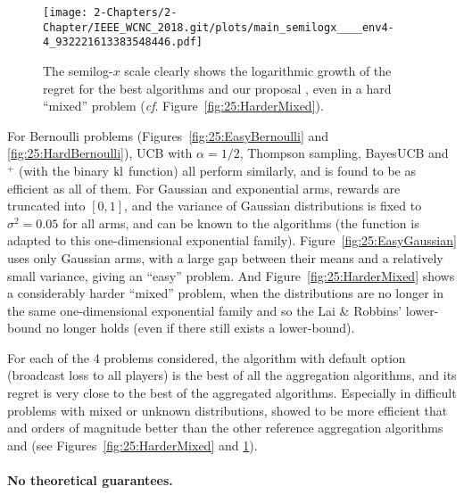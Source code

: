 \begin{figure}[b!]  %
	\centering
	\texttt{[image: 2-Chapters/2-Chapter/IEEE\_WCNC\_2018.git/plots/main\_semilogx\_\_\_\_env4-4\_932221613383548446.pdf]}
	\caption{The semilog-$x$ scale clearly shows the logarithmic growth of the regret for the best algorithms and our proposal \Aggr, even in a hard ``mixed'' problem (\emph{cf}. Figure~\ref{fig:25:HarderMixed}).}
	\label{fig:25:HarderMixed_semilogx}
\end{figure}

For Bernoulli problems (Figures~\ref{fig:25:EasyBernoulli} and \ref{fig:25:HardBernoulli}), UCB with $\alpha=1/2$, Thompson sampling, BayesUCB and \klUCB{}$^+$ (with the binary $\mathrm{kl}$ function) all perform similarly, and \Aggr{} is found to be as efficient as all of them.
For Gaussian and exponential arms, rewards are truncated into $[0,1]$, and the variance of Gaussian distributions is fixed to $\sigma^2 = 0.05$ for all arms, and can be known to the algorithms (the \kl{} function is adapted to this one-dimensional exponential family).
%
Figure~\ref{fig:25:EasyGaussian} uses only Gaussian arms, with a large gap between their means and a relatively small variance, giving an ``easy'' problem.
%
And Figure~\ref{fig:25:HarderMixed} shows a considerably harder ``mixed'' problem, when the distributions are no longer in the same one-dimensional exponential family and so the Lai \& Robbins' lower-bound no longer holds (even if there still exists a lower-bound).

For each of the 4 problems considered, the \Aggr{} algorithm with default option (broadcast loss to all players) is the best of all the aggregation algorithms,
and its regret is very close to the best of the aggregated algorithms.
Especially in difficult problems with mixed or unknown distributions, \Aggr{} showed to be more efficient that \ExpQ{} and orders of magnitude better than the other reference aggregation algorithms \LearnExp{} and \CORRAL{} (see Figures~\ref{fig:25:HarderMixed} and \ref{fig:25:HarderMixed_semilogx}).


\paragraph{No theoretical guarantees.}\label{sub:25:theory}

